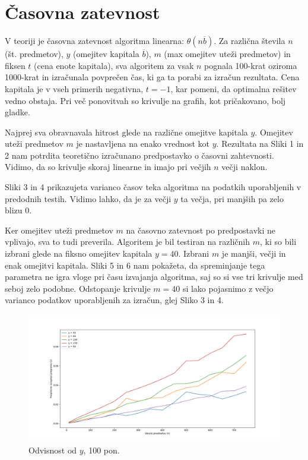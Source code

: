 \documentclass[a4paper, 11pt]{article}
\begin{document}
	\section{Časovna zatevnost}
	
	V teoriji je časovna zatevnost algoritma linearna: $\theta(n\overline{b})$. Za različna števila $n$ (št. predmetov), $y$ (omejitev kapitala $\overline{b}$), $m$ (max omejitev uteži predmetov) in fiksen $t$ (cena enote kapitala), sva algoritem za vsak $n$ pognala 100-krat oziroma 1000-krat in izračunala povprečen čas, ki ga ta porabi za izračun rezultata. Cena kapitala je v vseh primerih negativna, $t = -1$, kar pomeni, da optimalna rešitev vedno obstaja. Pri več ponovitvah so krivulje na grafih, kot pričakovano, bolj gladke.
	
	Najprej sva obravnavala hitrost glede na različne omejitve kapitala $y$. Omejitev uteži predmetov $m$ je nastavljena na enako vrednost kot $y$. Rezultata na Sliki 1 in 2 nam potrdita teoretično izračunano predpostavko o časovni zahtevnosti. Vidimo, da so krivulje skoraj linearne in imajo pri večjih $n$ večji naklon.
	
	Sliki 3 in 4 prikazujeta varianco časov teka algoritma na podatkih uporabljenih v predodnih testih. Vidimo lahko, da je za večji $y$ ta večja, pri manjših pa zelo blizu 0.
	
	Ker omejitev uteži predmetov $m$ na časovno zatevnost po predpostavki ne vplivajo, sva to tudi preverila. Algoritem je bil testiran na različnih $m$, ki so bili izbrani glede na fiksno omejitev kapitala $y=40$. Izbrani $m$ je manjši, večji in enak omejitvi kapitala. Sliki 5 in 6 nam pokažeta, da spreminjanje tega parametra ne igra vloge pri času izvajanja algoritma, saj so si vse tri krivulje med seboj zelo podobne. Odstopanje krivulje $m=40$ si lako pojasnimo z večjo varianco podatkov uporabljenih za izračun, glej Sliko 3 in 4.
	
	\begin{figure}[h]
    	\centering
    		\includegraphics[scale=0.35]{Graf_1_100.png}
    		\caption{Odvisnost od $y$, 100 pon.}
    		\label{fig:graf1_100}
	\end{figure}
	
\end{document}
